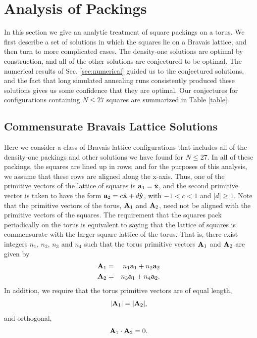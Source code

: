 \documentclass[aps]{revtex4}
\newcommand{\ax}{{\bf a}_1}
\newcommand{\ay}{{\bf a}_2}
\newcommand{\Ax}{{\bf A}_1}
\newcommand{\Ay}{{\bf A}_2}
\begin{document}
\section{Analysis of Packings}
\label{sec:analytics}

In this section we give an analytic treatment of square packings on a torus.  We first describe a set of solutions in which the squares lie on a Bravais lattice, and then turn to more complicated cases. The density-one solutions are optimal by construction, and all of the other solutions are conjectured to be optimal. The numerical results of Sec. \ref{sec:numerical} guided us to the conjectured solutions, and the fact that long simulated annealing runs consistently produced these solutions gives us some confidence that they are optimal.  Our conjectures for configurations containing $N \leq 27$ squares are summarized in Table \ref{table}.

\subsection{Commensurate Bravais Lattice Solutions}
Here we consider a class of Bravais lattice configurations that includes all of the density-one packings and other solutions we have found for  $N \leq 27$.   In all of these packings, the squares are lined up in rows; and for the purposes of this analysis, we assume that these rows are aligned along the x-axis. Thus, one of the primitive vectors of the lattice of squares is $\ax=\hat{{\bf x}}$, and the second primitive vector is taken to have the form $\ay=c \hat{{\bf x}} + d \hat{{\bf y}}$, with $-1< c <1$ and  $|d|\geq 1$.  Note that the primitive vectors of the torus, $\Ax$ and $\Ay$, need not be aligned with the primitive vectors of the squares.     The requirement that the squares pack periodically on the torus is equivalent to saying that the lattice of squares is commensurate with the larger square lattice of the torus.  That is, there exist  integers $n_1$, $n_2$, $n_3$ and $n_4$ such that the torus primitive vectors $\Ax$ and $\Ay$ are given by
\begin{eqnarray} 
\label{eqn:Ana}
\Ax&=& n_1 \ax + n_2 \ay \nonumber \\ 
\Ay&=&n_3 \ax + n_4 \ay.
\end{eqnarray}
In addition, we require that the torus primitive vectors are of equal length,
\begin{equation}
\label{eqn:normal}
|\Ax|=|\Ay| ,
\end{equation}
and orthogonal,
\begin{equation}
\label{eqn:ortho}
\Ax \cdot \Ay = 0 .
\end{equation}
\end{document}
